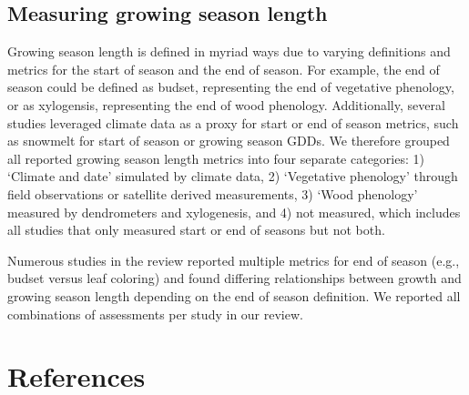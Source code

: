 \documentclass[11pt]{article}
\begin{document}
\subsection*{Measuring growing season length}

Growing season length is defined in myriad ways due to varying definitions and metrics for the start of season and the end of season. For example, the end of season could be defined as budset, representing the end of vegetative phenology, or as xylogensis, representing the end of wood phenology. Additionally, several studies leveraged climate data as a proxy for start or end of season metrics, such as snowmelt for start of season or growing season GDDs. We therefore grouped all reported growing season length metrics into four separate categories: 1) `Climate and date' simulated by climate data, 2) `Vegetative phenology' through field observations or satellite derived measurements, 3) `Wood phenology' measured by dendrometers and xylogenesis, and 4) not measured, which includes all studies that only measured start or end of seasons but not both. 

Numerous studies in the review reported multiple metrics for end of season (e.g., budset versus leaf coloring) and found differing relationships between growth and growing season length depending on the end of season definition. We reported all combinations of assessments per study in our review. 

\clearpage
\section{References}

\end{document}
